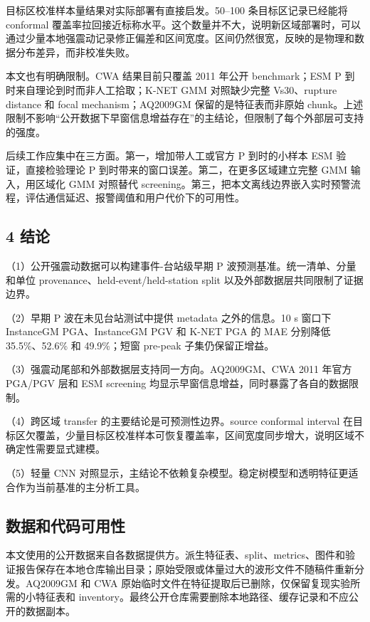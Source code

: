 \documentclass[
  11pt,
]{ctexart}
\begin{document}
目标区校准样本量结果对实际部署有直接启发。50--100 条目标区记录已经能将
conformal
覆盖率拉回接近标称水平。这个数量并不大，说明新区域部署时，可以通过少量本地强震动记录修正偏差和区间宽度。区间仍然很宽，反映的是物理和数据分布差异，而非校准失败。

本文也有明确限制。CWA 结果目前只覆盖 2011 年公开 benchmark；ESM P
到时来自理论到时而非人工拾取；K-NET GMM 对照缺少完整 Vs30、rupture
distance 和 focal mechanism；AQ2009GM 保留的是特征表而非原始
chunk。上述限制不影响``公开数据下早窗信息增益存在''的主结论，但限制了每个外部层可支持的强度。

后续工作应集中在三方面。第一，增加带人工或官方 P 到时的小样本 ESM
验证，直接检验理论 P 到时带来的窗口误差。第二，在更多区域建立完整 GMM
输入，用区域化 GMM 对照替代
screening。第三，把本文离线边界嵌入实时预警流程，评估通信延迟、报警阈值和用户代价下的可用性。

\subsection{4 结论}\label{ux7ed3ux8bba}

（1）公开强震动数据可以构建事件-台站级早期 P
波预测基准。统一清单、分量和单位 provenance、held-event/held-station
split 以及外部数据层共同限制了证据边界。

（2）早期 P 波在未见台站测试中提供 metadata 之外的信息。10 s 窗口下
InstanceGM PGA、InstanceGM PGV 和 K-NET PGA 的 MAE 分别降低
35.5\%、52.6\% 和 49.9\%；短窗 pre-peak 子集仍保留正增益。

（3）强震动尾部和外部数据层支持同一方向。AQ2009GM、CWA 2011 年官方
PGA/PGV 层和 ESM screening
均显示早窗信息增益，同时暴露了各自的数据限制。

（4）跨区域 transfer 的主要结论是可预测性边界。source conformal interval
在目标区欠覆盖，少量目标区校准样本可恢复覆盖率，区间宽度同步增大，说明区域不确定性需要显式建模。

（5）轻量 CNN
对照显示，主结论不依赖复杂模型。稳定树模型和透明特征更适合作为当前基准的主分析工具。

\subsection{数据和代码可用性}\label{ux6570ux636eux548cux4ee3ux7801ux53efux7528ux6027}

本文使用的公开数据来自各数据提供方。派生特征表、split、metrics、图件和验证报告保存在本地仓库输出目录；原始受限或体量过大的波形文件不随稿件重新分发。AQ2009GM
和 CWA 原始临时文件在特征提取后已删除，仅保留复现实验所需的小特征表和
inventory。最终公开仓库需要删除本地路径、缓存记录和不应公开的数据副本。
\end{document}

